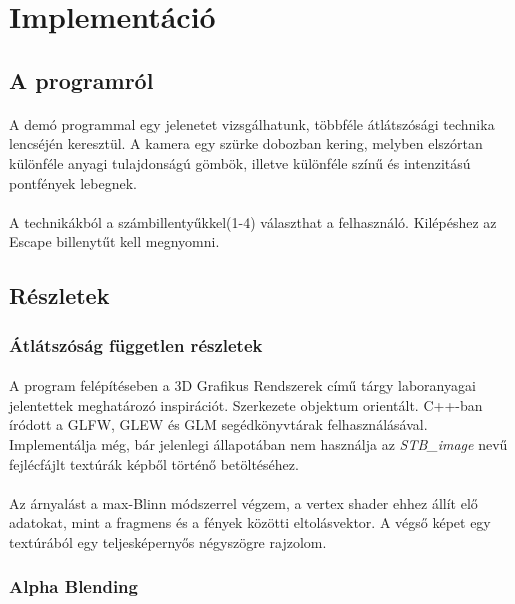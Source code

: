 \section{Implementáció}
\subsection{A programról}
\paragraph{}A demó programmal egy jelenetet vizsgálhatunk, többféle átlátszósági technika lencséjén keresztül. A kamera egy szürke dobozban kering, melyben elszórtan különféle anyagi tulajdonságú gömbök, illetve különféle színű és intenzitású pontfények lebegnek.
\paragraph{}A technikákból a számbillentyűkkel(1-4) választhat a felhasználó. Kilépéshez az Escape billenytűt kell megnyomni.
\subsection{Részletek}
\subsubsection{Átlátszóság független részletek}
\paragraph{}A program felépítéseben a 3D Grafikus Rendszerek című tárgy laboranyagai jelentettek meghatározó inspirációt. Szerkezete objektum orientált. C++-ban íródott a GLFW, GLEW és GLM segédkönyvtárak felhasználásával. Implementálja még, bár jelenlegi állapotában nem használja az \textit{STB\_image} nevű fejlécfájlt textúrák képből történő betöltéséhez.
\paragraph{}Az árnyalást a max-Blinn módszerrel végzem, a vertex shader ehhez állít elő adatokat, mint a fragmens és a fények közötti eltolásvektor. A végső képet egy textúrából egy teljesképernyős négyszögre rajzolom.
\subsubsection{Alpha Blending}
